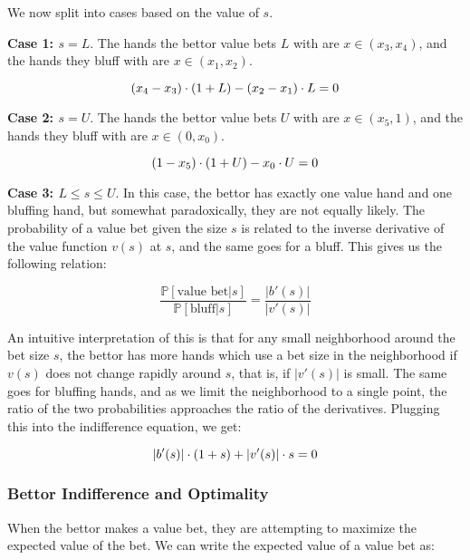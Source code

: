 \documentclass[../../main/main.tex]{subfiles}
\begin{document}
We now split into cases based on the value of $s$.

\textbf{Case 1: $s = L$}. The hands the bettor value bets $L$ with are $x \in (x_3, x_4)$, and the hands they bluff with are $x \in (x_1, x_2)$. 

\begin{equation}{\label{callindiffmin}}
    (x_4-x_3) \cdot (1+L) - (x_2-x_1) \cdot L = 0
\end{equation}

\textbf{Case 2: $s = U$}. The hands the bettor value bets $U$ with are $x \in (x_5, 1)$, and the hands they bluff with are $x \in (0, x_0)$. 

\begin{equation}{\label{callindiffmax}}
    (1-x_5) \cdot (1+U) - x_0 \cdot U = 0
\end{equation}

\textbf{Case 3: $L \leq s \leq U$}. In this case, the bettor has exactly one value hand and one bluffing hand, but somewhat paradoxically, they are not equally likely. The probability of a value bet given the size $s$ is related to the inverse derivative of the value function $v(s)$ at $s$, and the same goes for a bluff. This gives us the following relation:

\[ \frac{\mathbb{P}[\text{value bet} | s]}{\mathbb{P}[\text{bluff} | s]} = \frac{|b'(s)|}{|v'(s)|}\]

An intuitive interpretation of this is that for any small neighborhood around the bet size $s$, the bettor has more hands which use a bet size in the neighborhood if $v(s)$ does not change rapidly around $s$, that is, if $|v'(s)|$ is small. The same goes for bluffing hands, and as we limit the neighborhood to a single point, the ratio of the two probabilities approaches the ratio of the derivatives. Plugging this into the indifference equation, we get:

\begin{equation}{\label{callindiff}}
    |b'(s)| \cdot (1 + s) + |v'(s)| \cdot s = 0
\end{equation}

\subsubsection{Bettor Indifference and Optimality}

When the bettor makes a value bet, they are attempting to maximize the expected value of the bet. We can write the expected value of a value bet as:
\end{document}
